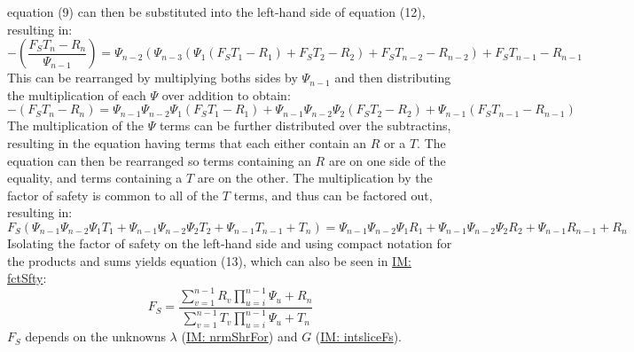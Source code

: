 \documentclass[12pt]{article}
\begin{document}
equation (9) can then be substituted into the left-hand side of equation (12), resulting in:
\begin{dmath}
-\left(\frac{{F_{S}} T_{n}-R_{n}}{Ψ_{n-1}}\right)=Ψ_{n-2} \left(Ψ_{n-3} \left(Ψ_{1} \left({F_{S}} T_{1}-R_{1}\right)+{F_{S}} T_{2}-R_{2}\right)+{F_{S}} T_{n-2}-R_{n-2}\right)+{F_{S}} T_{n-1}-R_{n-1}
\end{dmath}
This can be rearranged by multiplying boths sides by $Ψ_{n-1}$ and then distributing the multiplication of each $Ψ$ over addition to obtain:
\begin{dmath}
-\left({F_{S}} T_{n}-R_{n}\right)=Ψ_{n-1} Ψ_{n-2} Ψ_{1} \left({F_{S}} T_{1}-R_{1}\right)+Ψ_{n-1} Ψ_{n-2} Ψ_{2} \left({F_{S}} T_{2}-R_{2}\right)+Ψ_{n-1} \left({F_{S}} T_{n-1}-R_{n-1}\right)
\end{dmath}
The multiplication of the $Ψ$ terms can be further distributed over the subtractins, resulting in the equation having terms that each either contain an $R$ or a $T$. The equation can then be rearranged so terms containing an $R$ are on one side of the equality, and terms containing a $T$ are on the other. The multiplication by the factor of safety is common to all of the $T$ terms, and thus can be factored out, resulting in:
\begin{dmath}
{F_{S}} \left(Ψ_{n-1} Ψ_{n-2} Ψ_{1} T_{1}+Ψ_{n-1} Ψ_{n-2} Ψ_{2} T_{2}+Ψ_{n-1} T_{n-1}+T_{n}\right)=Ψ_{n-1} Ψ_{n-2} Ψ_{1} R_{1}+Ψ_{n-1} Ψ_{n-2} Ψ_{2} R_{2}+Ψ_{n-1} R_{n-1}+R_{n}
\end{dmath}
Isolating the factor of safety on the left-hand side and using compact notation for the products and sums yields equation (13), which can also be seen in \hyperref[IM:fctSfty]{IM: fctSfty}:
\begin{dmath}
{F_{S}}=\frac{\displaystyle\sum_{v=1}^{n-1}{R_{v} \displaystyle\prod_{u=i}^{n-1}{Ψ_{u}}}+R_{n}}{\displaystyle\sum_{v=1}^{n-1}{T_{v} \displaystyle\prod_{u=i}^{n-1}{Ψ_{u}}}+T_{n}}
\end{dmath}
${F_{S}}$ depends on the unknowns $λ$ (\hyperref[IM:nrmShrFor]{IM: nrmShrFor}) and $G$ (\hyperref[IM:intsliceFs]{IM: intsliceFs}).
~\newline
\end{document}

